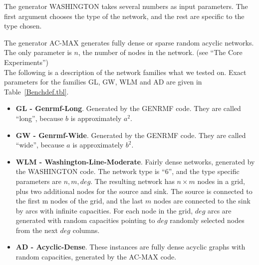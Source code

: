 The generator WASHINGTON takes several numbers as input parameters.
The first argument chooses the type of the network, and the rest are
specific to the type chosen. 

The generator AC-MAX generates fully dense or sparse random
acyclic networks. The only parameter is $n$, the number of nodes in
the network. (see ``The Core Experiments'')\\ 

The following is a description of the network families what we tested
on. Exact parameters for the families GL, GW, WLM and AD are given in
Table~\ref{Benchdef.tbl}.

\begin{itemize}

\item	{\bf GL - Genrmf-Long}. Generated by the GENRMF code. They are called
``long'', because $ b$ is approximately $a^2$. 
 
\item 	{\bf GW - Genrmf-Wide}. Generated by the GENRMF code. They are called
``wide'', because $ a$ is approximately $b^2$. 

\item 	{\bf WLM - Washington-Line-Moderate}. Fairly dense networks,
generated by the WASHINGTON code. The network type is ``6'', and the type
specific parameters are $ n, m, deg$. The resulting network has
$ n \times m$ nodes in a grid, plus two additional nodes for the
source and sink. The source is connected to the first m nodes of the
grid, and the last $ m$ nodes are connected to the sink by arcs with
infinite capacities. For each node in the
grid, $ deg$ arcs are generated with random capacities pointing to
$ deg$ randomly selected nodes from the next $ deg$ columns.
   
\item	{\bf AD  - Acyclic-Dense}. These instances are fully dense
acyclic graphs with random capacities, generated by the AC-MAX code.


\end{itemize}
